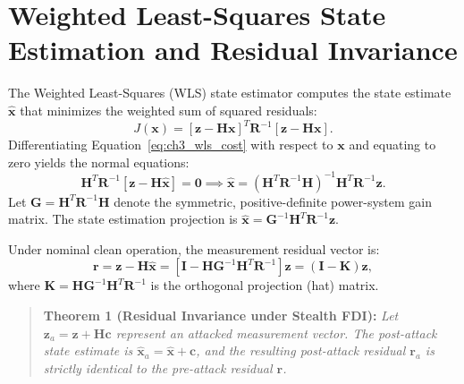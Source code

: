 \documentclass[12pt,a4paper]{report}
\begin{document}
\section{Weighted Least-Squares State Estimation and Residual Invariance}
The Weighted Least-Squares (WLS) state estimator computes the state estimate $\hat{\boldsymbol{x}}$
that minimizes the weighted sum of squared residuals:
\begin{equation}
J(\boldsymbol{x}) = [\boldsymbol{z} - \boldsymbol{H}\boldsymbol{x}]^T \boldsymbol{R}^{-1} [\boldsymbol{z} - \boldsymbol{H}\boldsymbol{x}].
\label{eq:ch3_wls_cost}
\end{equation}
Differentiating Equation~\eqref{eq:ch3_wls_cost} with respect to $\boldsymbol{x}$ and equating
to zero yields the normal equations:
\begin{equation}
\boldsymbol{H}^T \boldsymbol{R}^{-1} [\boldsymbol{z} - \boldsymbol{H}\hat{\boldsymbol{x}}] = \boldsymbol{0} \implies \hat{\boldsymbol{x}} = (\boldsymbol{H}^T \boldsymbol{R}^{-1} \boldsymbol{H})^{-1} \boldsymbol{H}^T \boldsymbol{R}^{-1} \boldsymbol{z}.
\label{eq:ch3_normal_eqs}
\end{equation}
Let $\boldsymbol{G} = \boldsymbol{H}^T \boldsymbol{R}^{-1} \boldsymbol{H}$ denote the symmetric,
positive-definite power-system gain matrix. The state estimation projection is $\hat{\boldsymbol{x}} = \boldsymbol{G}^{-1} \boldsymbol{H}^T \boldsymbol{R}^{-1} \boldsymbol{z}$.

Under nominal clean operation, the measurement residual vector is:
\begin{equation}
\boldsymbol{r} = \boldsymbol{z} - \boldsymbol{H}\hat{\boldsymbol{x}} = [\boldsymbol{I} - \boldsymbol{H}\boldsymbol{G}^{-1}\boldsymbol{H}^T\boldsymbol{R}^{-1}]\boldsymbol{z} = (\boldsymbol{I} - \boldsymbol{K})\boldsymbol{z},
\label{eq:ch3_clean_residual}
\end{equation}
where $\boldsymbol{K} = \boldsymbol{H}\boldsymbol{G}^{-1}\boldsymbol{H}^T\boldsymbol{R}^{-1}$ is the
orthogonal projection (hat) matrix.

\begin{quote}
\textbf{Theorem 1 (Residual Invariance under Stealth FDI):}
\textit{Let $\boldsymbol{z}_a = \boldsymbol{z} + \boldsymbol{H}\boldsymbol{c}$ represent an attacked
measurement vector. The post-attack state estimate is $\hat{\boldsymbol{x}}_a = \hat{\boldsymbol{x}} + \boldsymbol{c}$,
and the resulting post-attack residual $\boldsymbol{r}_a$ is strictly identical to the pre-attack residual $\boldsymbol{r}$.}
\end{quote}
\end{document}
